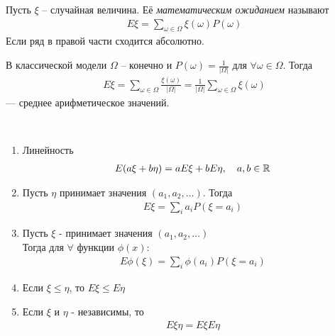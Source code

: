 \begin{definition}
	Пусть $\xi$ -- случайная величина. Её \emph{математическим ожиданием} называют 
	\begin{align*}
		E \xi = \sum_{\omega \in \Omega} \xi(\omega) P(\omega)
	\end{align*}
	Если ряд в правой части сходится абсолютно.
\end{definition}

\begin{example}
	В классической модели $\Omega$ -- конечно и $P(\omega) = 
	\frac{1}{|\Omega|}$ для $\forall \omega \in \Omega$. Тогда
	\begin{align*}
		E \xi = \sum_{\omega \in \Omega} \frac{\xi(\omega)}{|\Omega|} = 
		\frac{1}{|\Omega|} \sum\limits_{\omega \in \Omega} \xi(\omega)
	\end{align*}
	--- среднее арифметическое значений.
\end{example}

\begin{lemma}~

	\begin{enumerate}
		\item Линейность 
			\begin{align*}
				E(a \xi + b \eta) = a E \xi + b E \eta, \quad a, b \in \mathbb{R}
			\end{align*}
			
		\item Пусть $\eta$ принимает значения $(a_1, a_2, \ldots)$. Тогда
			\begin{align*}
				E \xi = \sum_i a_i P(\xi = a_i)
			\end{align*}
		
		\item Пусть $\xi$ - принимает значения $(a_1, a_2, \ldots)$\\
			Тогда для $\forall$ функции $\phi(x)$:
			\begin{align*}
				E \phi(\xi) = \sum_i \phi(a_i) P(\xi = a_i)
			\end{align*}
		
		\item Если $\xi \leq \eta$, то $E \xi \leq E \eta$
		
		\item Если $\xi$ и $\eta$ - независимы, то
			\begin{align*}
				E \xi \eta = E \xi E \eta
			\end{align*}
	\end{enumerate}
\end{lemma}

